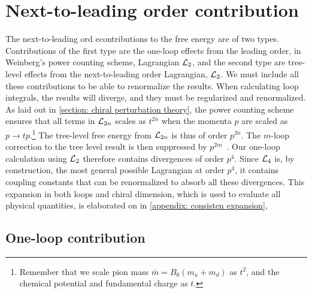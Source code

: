 \section{Next-to-leading order contribution}

The next-to-leading ord econtributions to the free energy are of two types.
Contributions of the first type are the one-loop effects from the leading order, in Weinberg's power counting scheme, Lagrangian $\mathcal{L}_2$, and the second type are tree-level effects from the next-to-leading order Lagrangian, $\mathcal{L}_2$.
We must include all these contributions to be able to renormalize the results.
When calculating loop integrals, the results will diverge, and they must be regularized and renormalized.
As laid out in \autoref{section: chiral perturbation theory}, the power counting scheme ensures that all terms in $\mathcal{L}_{2n}$ scales as $t^{2n}$ when the momenta $p$ are scaled as  $p \rightarrow t p$.\footnote{
    Remember that we scale pion mass $\bar m = B_0(m_u + m_d)$ as $t^2$, and the chemical potential and fundamental charge as $t$.
    }
The tree-level free energy from $\mathcal{L}_{2n}$ is thus of order $p^{2n}$.
The $m$-loop correction to the tree level result is then suppressed by $p^{2m}$~\autocite{gasserChiralPerturbationTheory1984,weinbergPhenomenologicalLagrangians1979}.
Our one-loop calculation using $\mathcal{L}_2$ therefore contains divergences of order $p^{4}$. 
Since $\mathcal{L}_4$ is, by construction, the most general possible Lagrangian at order $p^4$, it contains coupling constants that can be renormalized to absorb all these divergences.
This expansion in both loops and chiral dimension, which is used to evaluate all physical quantities, is elaborated on in \autoref{appendix: consisten expansion}, 


\subsection{One-loop contribution}

